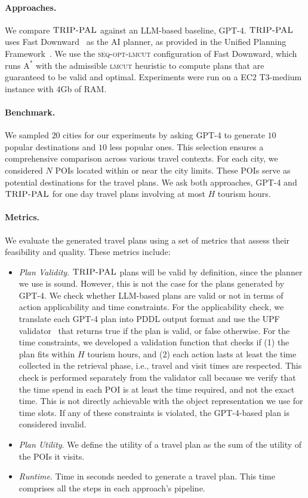 \documentclass[letterpaper]{article}
\newcommand{\gpt}{{\sc GPT-4}\xspace}
\newcommand{\approach}{\ensuremath{\textsc{TRIP-PAL}}\xspace}
\begin{document}
\paragraph{Approaches.}
We compare \approach against an LLM-based baseline, \gpt.
\approach uses Fast Downward~\cite{helmert06} as the AI planner, as provided in the Unified Planning Framework~\cite{upf}.
We use the \textsc{seq-opt-lmcut} configuration of Fast Downward, which runs $\mbox{A}^*$ with the admissible \textsc{lmcut} heuristic to compute plans that are guaranteed to be valid and optimal.
Experiments were run on a EC2 T3-medium instance with 4Gb of RAM.

\paragraph{Benchmark.}
We sampled $20$ cities for our experiments by asking \gpt to generate $10$ popular destinations and $10$ less popular ones.
This selection ensures a comprehensive comparison across various travel contexts.
For each city, we considered $N$ POIs located within or near the city limits. 
These POIs serve as potential destinations for the travel plans.
We ask both approaches, \gpt and \approach for one day travel plans involving at most $H$ tourism hours.

\paragraph{Metrics.}
We evaluate the generated travel plans using a set of metrics that assess their feasibility and quality. These metrics include:
\begin{itemize}
    
    \item \textit{Plan Validity}. \approach plans will be valid by definition, since the planner we use is sound. However, this is not the case for the plans generated by \gpt. We check whether LLM-based plans are valid or not in terms of action applicability and time constraints. For the applicability check, we translate each \gpt plan into PDDL output format and use the UPF validator~\cite{upf} that returns true if the plan is valid, or false otherwise.
    For the time constraints, we developed a validation function that checks if (1) the plan fits within $H$ tourism hours, and (2) each action lasts at least the time collected in the retrieval phase, i.e., travel and visit times are respected. This check is performed separately from the validator call because we verify that the time spend in each POI is at least the time required, and not the exact time. This is not directly achievable with the object representation we use for time slots. 
    If any of these constraints is violated, the \gpt-based plan is considered invalid.  
    \item \textit{Plan Utility}. We define the utility of a travel plan as the sum of the utility of the POIs it visits.
    
    \item \textit{Runtime}. Time in seconds needed to generate a travel plan. 
    This time comprises all the steps in each approach's pipeline.
\end{itemize}
\end{document}
